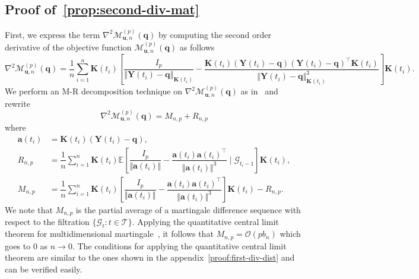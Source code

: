 \documentclass[aos]{imsart}
\theoremstyle{plain}
\theoremstyle{remark}
\def\E{\mathbb{E}}
\newcommand{\Mcal}{\mathcal{M}}
\newcommand{\Gcal}{\mathcal{G}}
\newcommand{\Tcal}{\mathcal{T}}
\newcommand{\bb}[1]{\boldsymbol{#1}}
\newcommand{\tr}{^{\intercal}}
\begin{document}
\subsection{Proof of~\ref{prop:second-div-mat}}\label{proof:second-div-mat}

First, we express the term $\nabla^2 \Mcal_{\bb{u},n}^{(p)}(\bb{q})$ by computing the second order derivative of the objective function $\Mcal_{\bb{u},n}^{(p)}(\bb{q})$ as follows
\begin{equation*}
    \nabla^2 \Mcal_{\bb{u},n}^{(p)}(\bb{q}) 
    = \dfrac{1}{n}\sum_{i=1}^n \bb{K}(t_i) \left[ \dfrac{I_p}{\left\Vert  \bb{Y}(t_i) - \bb{q} \right\Vert_{\bb{K}(t_i)} } 
 - \dfrac{\bb{K}(t_i)(\bb{Y}(t_i) - \bb{q})(\bb{Y}(t_i) - \bb{q})\tr \bb{K}(t_i)}{\left\Vert  \bb{Y}(t_i) - \bb{q} \right\Vert^3_{\bb{K}(t_i)}} \right] \bb{K}(t_i).
\end{equation*}
\noindent We perform an M-R decomposition technique on $\nabla^2 \Mcal_{\bb{u},n}^{(p)}(\bb{q})$ as in~\cite{zhao2008confidence} and rewrite 
\begin{equation*}
    \nabla^2 \Mcal_{\bb{u},n}^{(p)}(\bb{q}) = M_{n,p} + R_{n,p}
\end{equation*}
\noindent where 
\begin{align*}
    \bb{a}(t_i) & = \bb{K}(t_i) (\bb{Y}(t_i) - \bb{q}),\\
    R_{n,p} & = \dfrac{1}{n}\sum_{i=1}^n \bb{K}(t_i) \E\left[ \dfrac{I_p}{\Vert \bb{a}(t_i)\Vert } - \dfrac{\bb{a}(t_i) \bb{a}(t_i)\tr}{\Vert \bb{a}(t_i)\Vert^3 }  \mid \Gcal_{t_i-1} \right] \bb{K}(t_i),\\
    M_{n,p} & = \dfrac{1}{n}\sum_{i=1}^n \bb{K}(t_i) \left[ \dfrac{I_p}{\Vert \bb{a}(t_i)\Vert } - \dfrac{\bb{a}(t_i) \bb{a}(t_i)\tr}{\Vert \bb{a}(t_i)\Vert^3 } \right] \bb{K}(t_i) - R_{n,p}.
\end{align*}
\noindent We note that $M_{n,p}$ is the partial average of a martingale difference sequence with respect to the filtration $\{ \Gcal_{t} : t \in \Tcal \}$. Applying the quantitative central limit theorem for multidimensional martingale~\citep{belloni2018high}, it follows that $M_{n,p} = \mathcal{O}(pb_n)$ which goes to $0$ as $n \rightarrow 0$. The conditions for applying the quantitative central limit theorem are similar to the ones shown in the appendix~\ref{proof:first-div-dist} and can be verified easily.
\end{document}
